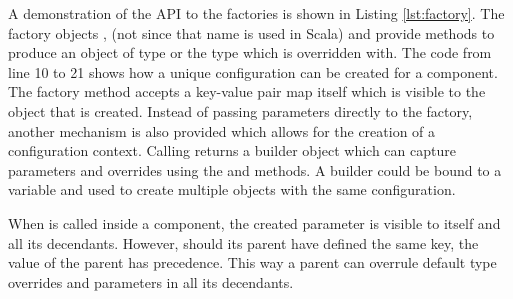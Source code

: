 A demonstration of the API to the factories is shown in Listing \ref{lst:factory}. The factory objects ,  (not  since that name is used in Scala) and  provide  methods to produce an object of type  or the type which  is overridden with. The code from line 10 to 21 shows how a unique configuration can be created for a component. The factory  method accepts a key-value pair map itself which is visible to the object that is created. Instead of passing parameters directly to the factory, another mechanism is also provided which allows for the creation of a configuration context. Calling  returns a builder object which can capture parameters and overrides using the  and  methods. A builder could be bound to a variable and used to create multiple objects with the same configuration. 

When  is called inside a component, the created parameter is visible to itself and all its decendants. However, should its parent have defined the same key, the value of the parent has precedence. This way a parent can overrule default type overrides and parameters in all its decendants. 





